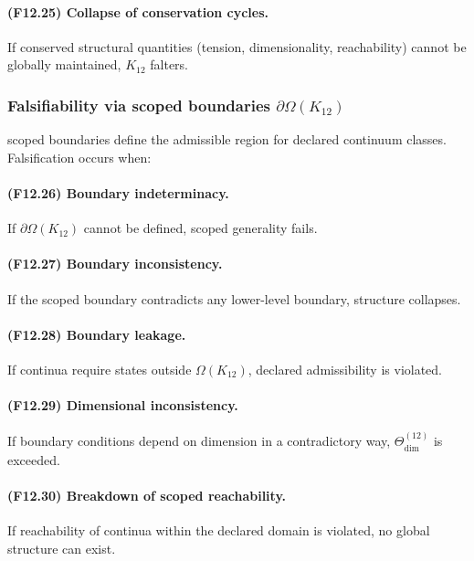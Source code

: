 \paragraph{(F12.25) Collapse of conservation cycles.}
If conserved structural quantities (tension, dimensionality, reachability)
cannot be globally maintained, $K_{12}$ falters.



\subsubsection{Falsifiability via scoped boundaries $\partial\Omega(K_{12})$}

scoped boundaries define the admissible region for declared continuum classes.
Falsification occurs when:

\paragraph{(F12.26) Boundary indeterminacy.}
If $\partial\Omega(K_{12})$ cannot be defined, scoped generality fails.

\paragraph{(F12.27) Boundary inconsistency.}
If the scoped boundary contradicts any lower-level boundary,
structure collapses.

\paragraph{(F12.28) Boundary leakage.}
If continua require states outside $\Omega(K_{12})$,
declared admissibility is violated.

\paragraph{(F12.29) Dimensional inconsistency.}
If boundary conditions depend on dimension in a contradictory way,
$\Theta_{\mathrm{dim}}^{(12)}$ is exceeded.

\paragraph{(F12.30) Breakdown of scoped reachability.}
If reachability of continua within the declared domain is violated,
no global structure can exist.



